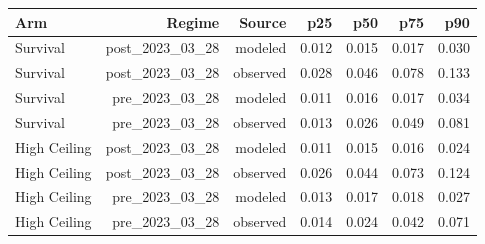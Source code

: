 \begin{tabular}{lrrrrrr}
\toprule
Arm & Regime & Source & p25 & p50 & p75 & p90 \\
\midrule
Survival & post\_2023\_03\_28 & modeled & 0.012 & 0.015 & 0.017 & 0.030 \\
Survival & post\_2023\_03\_28 & observed & 0.028 & 0.046 & 0.078 & 0.133 \\
Survival & pre\_2023\_03\_28 & modeled & 0.011 & 0.016 & 0.017 & 0.034 \\
Survival & pre\_2023\_03\_28 & observed & 0.013 & 0.026 & 0.049 & 0.081 \\
High Ceiling & post\_2023\_03\_28 & modeled & 0.011 & 0.015 & 0.016 & 0.024 \\
High Ceiling & post\_2023\_03\_28 & observed & 0.026 & 0.044 & 0.073 & 0.124 \\
High Ceiling & pre\_2023\_03\_28 & modeled & 0.013 & 0.017 & 0.018 & 0.027 \\
High Ceiling & pre\_2023\_03\_28 & observed & 0.014 & 0.024 & 0.042 & 0.071 \\
\bottomrule
\end{tabular}
